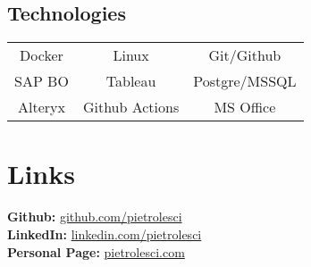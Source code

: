 \documentclass[]{deedy-resume-reversed}
\begin{document}
\begin{minipage}[t]{0.33\textwidth}
\vspace{-\topsep}
\subsection{Technologies}
\begin{tabular}{ccc}
Docker & Linux & Git/Github\\
SAP BO & Tableau & Postgre/MSSQL\\
Alteryx & Github Actions & MS Office\\
\end{tabular}
\sectionsep



\section{Links}
\textbf{Github:} \href{https://github.com/pietrolesci}{github.com/pietrolesci}\\
\textbf{LinkedIn:} \href{https://www.linkedin.com/in/pietrolesci}{linkedin.com/pietrolesci} \\
\textbf{Personal Page:} \href{https://pietrolesci.com}{pietrolesci.com}
\sectionsep

\end{minipage}
\end{document}
